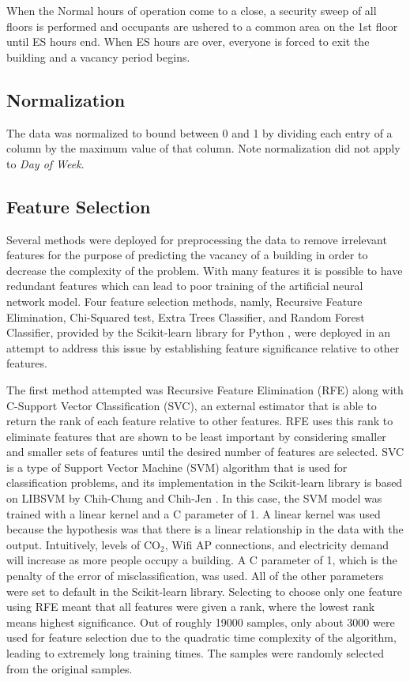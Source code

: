 \documentclass[letterpaper, 12 pt, conference]{ieeeconf}  %
\begin{document}
When the Normal hours of operation come to a close, a security sweep of all floors is performed and occupants are ushered to a common area on the 1st floor until ES hours end. When ES hours are over, everyone is forced to exit the building and a vacancy period begins.

\subsection{Normalization}

The data was normalized to bound between 0 and 1 by dividing each entry of a column by the maximum value of that column. Note normalization did not apply to \textit{Day of Week}.

\subsection{Feature Selection}

Several methods were deployed for preprocessing the data to remove irrelevant features for the purpose of predicting the vacancy of a building in order to decrease the complexity of the problem. With many features it is possible to have redundant features which can lead to poor training of the artificial neural network model. Four feature selection methods, namly, Recursive Feature Elimination, Chi-Squared test, Extra Trees Classifier, and  Random Forest Classifier, provided by the Scikit-learn library for Python \cite{Pedregosa}, were deployed in an attempt to address this issue by establishing feature significance relative to other features.

The first method attempted was Recursive Feature Elimination (RFE) along with C-Support Vector Classification (SVC), an external estimator that is able to return the rank of each feature relative to other features. RFE uses this rank to eliminate features that are shown to be least important by considering smaller and smaller sets of features until the desired number of features are selected. SVC is a type of Support Vector Machine (SVM) algorithm that is used for classification problems, and its implementation in the Scikit-learn library is based on LIBSVM by Chih-Chung and Chih-Jen \cite{LIBSVM}. In this case, the SVM model was trained with a linear kernel and a C parameter of 1. A linear kernel was used because the hypothesis was that there is a linear relationship in the data with the output. Intuitively, levels of CO$_2$, Wifi AP connections, and electricity demand will increase as more people occupy a building. A C parameter of 1, which is the penalty of the error of misclassification, was used.  All of the other parameters were set to default in the Scikit-learn library. Selecting to choose only one feature using RFE meant that all features were given a rank, where the lowest rank means highest significance. Out of roughly 19000 samples, only about 3000 were used for feature selection due to the quadratic time complexity of the algorithm, leading to extremely long training times. The samples were randomly selected from the original samples.
        
\end{document}

